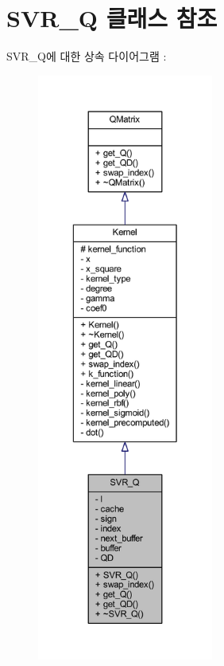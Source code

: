 \hypertarget{class_s_v_r___q}{\section{S\+V\+R\+\_\+\+Q 클래스 참조}
\label{class_s_v_r___q}
}


S\+V\+R\+\_\+\+Q에 대한 상속 다이어그램 \+: 
\nopagebreak
\begin{figure}[H]
\begin{center}
\leavevmode
\includegraphics[height=550pt]{class_s_v_r___q__inherit__graph}
\end{center}
\end{figure}


